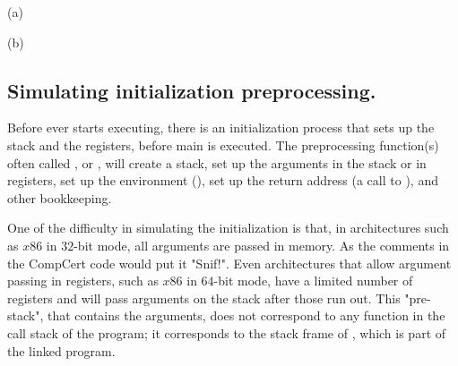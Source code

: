 \begin{table}\centering
\begin{multicols}{2}

(a)


(b)
\end{multicols}
\caption{Entry simulation diagrams. (a) if $s_1$ is an initial state for the source program, then there exists some state $s_2$ that is related to $s_1$ and is an initial state for the compiled program. (b) Just like the diagram for initial states, but it generalizes and exposes the initial memory $m_0$, the entry function $f$ and the arguments . The entire simulation is parametric on the realation $\sim$.}\label{table:initial_sim}
\end{table}

\subsection{Simulating initialization preprocessing.}
Before  ever starts executing, there is an initialization process that sets up the stack and the registers, before main is executed. The preprocessing function(s) often called ,  or , will create a stack, set up the arguments in the stack or in registers, set up the environment (), set up the return address (a call to ), and other bookkeeping. 


One of the difficulty in simulating the initialization is that, in architectures such as $x86$ in $32$-bit mode, all arguments are passed in memory. As the comments in the CompCert code would put it "Snif!"\cite{leroy19:compcert}. Even architectures that allow argument passing in registers, such as $x86$ in $64$-bit mode, have a limited number of registers and will pass arguments on the stack after those run out. This "pre-stack", that contains the arguments, does not correspond to any function in the call stack of the program; it corresponds to the stack frame of , which is part of the linked program.

